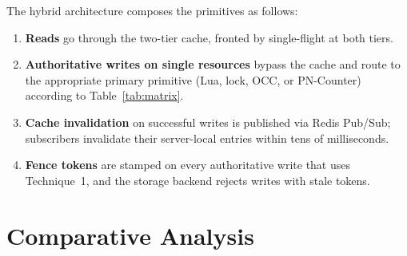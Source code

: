 \noindent The hybrid architecture composes the primitives as follows:
\begin{enumerate}[leftmargin=*]
    \item \textbf{Reads} go through the two-tier cache, fronted by single-flight at both tiers.
    \item \textbf{Authoritative writes on single resources} bypass the cache and route to the appropriate primary primitive (Lua, lock, OCC, or PN-Counter) according to Table~\ref{tab:matrix}.
    \item \textbf{Cache invalidation} on successful writes is published via Redis Pub/Sub; subscribers invalidate their server-local entries within tens of milliseconds.
    \item \textbf{Fence tokens} are stamped on every authoritative write that uses Technique~1, and the storage backend rejects writes with stale tokens.
\end{enumerate}

\section{Comparative Analysis}

\begin{table}[h]
\centering
\footnotesize
\setlength{\tabcolsep}{4pt}
\renewcommand{\arraystretch}{1.2}
\caption{Comparative properties of the five contention primitives.}
\label{tab:compare}
\end{table}

